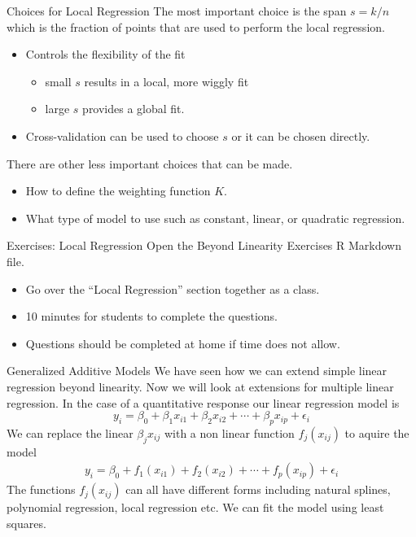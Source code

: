 \documentclass[
  ignorenonframetext,
  aspectratio=169,
]{beamer}
\begin{document}
\begin{frame}{Choices for Local Regression}
\protect\hypertarget{choices-for-local-regression}{}
The most important choice is the
\alert{span $s = k/n$ which is the fraction of points that are used to perform the local regression}.

\begin{itemize}
\item
  Controls the flexibility of the fit

  \begin{itemize}
  \item
    small \(s\) results in a local, more wiggly fit
  \item
    large \(s\) provides a global fit.
  \end{itemize}
\item
  Cross-validation can be used to choose \(s\) or it can be chosen
  directly.
\end{itemize}

There are other less important choices that can be made.

\begin{itemize}
\item
  How to define the weighting function \(K\).
\item
  What type of model to use such as constant, linear, or quadratic
  regression.
\end{itemize}
\end{frame}

\begin{frame}{Exercises: Local Regression}
\protect\hypertarget{exercises-local-regression}{}
Open the Beyond Linearity Exercises R Markdown file.

\begin{itemize}
\item
  Go over the ``Local Regression'' section together as a class.
\item
  10 minutes for students to complete the questions.
\item
  Questions should be completed at home if time does not allow.
\end{itemize}
\end{frame}

\begin{frame}{Generalized Additive Models}
\protect\hypertarget{generalized-additive-models}{}
We have seen how we can extend simple linear regression beyond
linearity. Now we will look at extensions for multiple linear
regression. In the case of a \alert{quantitative response} our linear
regression model is
\[y_{i}=\beta_{0}+\beta_{1} x_{i 1}+\beta_{2} x_{i 2}+\cdots+\beta_{p} x_{i p}+\epsilon_{i}\]
We can replace the linear \(\beta_{j} x_{i j}\) with a non linear
function \(f_{j}\left(x_{i j}\right)\) to aquire the model \[
\begin{aligned}
y_{i} =\beta_{0}+f_{1}\left(x_{i 1}\right)+f_{2}\left(x_{i 2}\right)+\cdots+f_{p}\left(x_{i p}\right)+\epsilon_{i}
\end{aligned}
\] The functions \(f_{j}\left(x_{i j}\right)\) can all have different
forms including natural splines, polynomial regression, local regression
etc. We can fit the model using least squares.
\end{frame}
\end{document}
